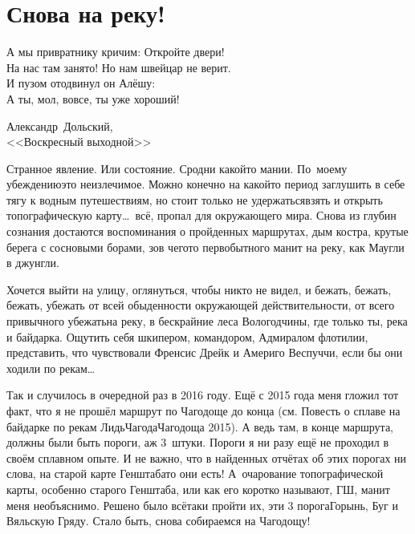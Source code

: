 \chapter{Снова на реку!} 

\setlength{\epigraphwidth}{0.75\textwidth}

\epigraph{%
	А мы привратнику кричим: Откройте двери! \\
	На нас там занято! Но нам швейцар не верит. \\
	И пузом отодвинул он Алёшу: \\
	А ты, мол, вовсе, ты уже хороший!}
	{
	\begin{flushright}
		\small{Александр~Дольский,\\<<Воскресный выходной>>}
	\end{flushright}
	}

Странное явление. Или состояние. Сродни какой\sdash то мании. По~моему убеждению\mdash это неизлечимое. Можно конечно на какой\sdash то период заглушить в себе тягу к водным путешествиям, но стоит только не удержаться\mdash взять и открыть топографическую карту\ldots~всё, пропал для окружающего мира. Снова из глубин сознания достаются воспоминания о пройденных маршрутах, дым костра, крутые берега с сосновыми борами, зов чего\sdash то первобытного манит на реку, как Маугли в джунгли. 

Хочется выйти на улицу, оглянуться, чтобы никто не видел, и бежать, бежать, бежать, убежать от всей обыденности окружающей действительности, от всего привычного убежать\mdash на реку, в бескрайние леса Вологодчины, где только ты, река и байдарка. Ощутить себя шкипером, командором, Адмиралом флотилии, представить, что чувствовали Френсис Дрейк и Америго Веспуччи, если бы они ходили по рекам\ldots 

Так и случилось в очередной раз в 2016 году. Ещё с 2015 года меня гложил тот факт, что я не прошёл маршрут по Чагодоще до конца (см. Повесть о сплаве на байдарке по рекам Лидь\sdash Чагода\sdash Чагодоща 2015). А ведь там, в конце маршрута, должны были быть пороги, аж 3~штуки. Пороги я ни разу ещё не проходил в своём сплавном опыте. И не важно, что в найденных отчётах об этих порогах ни слова, на старой карте Генштаба\sdash то они есть! А~очарование топографической карты, особенно старого Генштаба, или как его коротко называют, ГШ, манит меня необъяснимо. Решено было всё\sdash таки пройти их, эти 3 порога\mdash Горынь, Буг и Вяльскую Гряду. Стало быть, снова собираемся на Чагодощу!

